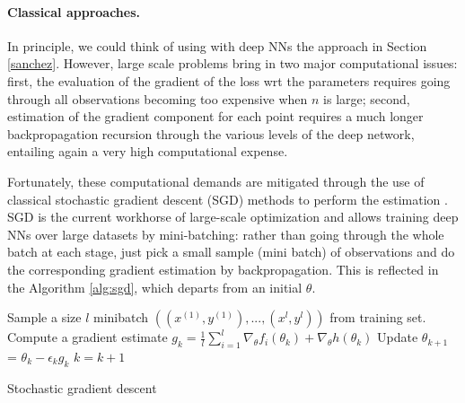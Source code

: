 \paragraph{Classical approaches.}

In principle, we could think of using 
with deep NNs the approach in Section \ref{sanchez}. However,
 large scale problems bring in two major
computational issues: first, the 
evaluation of the gradient of the loss wrt the parameters
requires going through all observations
 becoming too expensive when $n$ is large;
second, estimation of the gradient component
for each point requires a much longer backpropagation recursion through the various levels of the
deep network, 
entailing again a very high computational 
expense. 

Fortunately, these computational demands are mitigated
through the use of classical stochastic gradient descent
(SGD)
methods \parencite{robbins}
to perform the estimation \parencite{bottou2010large}. SGD is the current workhorse of large-scale optimization and 
allows training deep NNs over large datasets by mini-batching: rather than going through the whole batch at each stage, just pick a small sample
(mini batch) of observations and do the corresponding
gradient estimation by backpropagation. This is reflected in the Algorithm \ref{alg:sgd}, which departs from an
initial $\theta$.

\begin{algorithm}[!ht]
\begin{algorithmic}[1]
  \State Sample a size $l$ minibatch 
      $((x^{(1)}, y^{(1)}),..., (x^{l},y^{l})) $
              from training set. 
\State Compute a gradient estimate
      $g_k = \frac{1}{l} \sum_{i=1}^l \nabla_{\theta} f_i(\theta_k) + \nabla_{\theta} h(\theta_k)$
\State    Update $\theta_{k+1} $ = $\theta_k -\epsilon _k g_k$ 
\State    $k=k+1$ 
 \EndWhile
\end{algorithmic}
 \caption{Stochastic gradient descent}\label{alg:sgd}
\end{algorithm}

